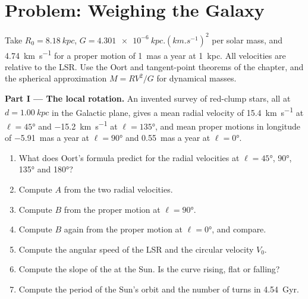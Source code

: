 \section{Problem: Weighing the Galaxy}

\begin{problem}
\label{pb:b3:milky-way-galaxies:1}
Take $R_0 = \qty{8.18}{kpc}$, $G = \qty{4.301e-6}{kpc.(km.s^{-1})^2}$ per
solar mass, and \qty{4.74}{km.s^{-1}} for a proper motion of
\qty{1}{mas} a year at \qty{1}{kpc}. All velocities are relative to the
LSR. Use the Oort and tangent-point theorems of the chapter, and the
spherical approximation $M = RV^2/G$ for dynamical masses.

\medskip\noindent\textbf{Part I --- The local rotation.} An invented
survey of red-clump stars, all at $d = \qty{1.00}{kpc}$ in the Galactic
plane, gives a mean radial velocity of \qty{+15.4}{km.s^{-1}} at
$\ell = \ang{45}$ and \qty{-15.2}{km.s^{-1}} at $\ell = \ang{135}$, and
mean proper motions in longitude of \qty{-5.91}{mas} a year at
$\ell = \ang{90}$ and \qty{+0.55}{mas} a year at $\ell = \ang{0}$.
\begin{enumerate}
\item What does Oort's formula predict for the radial velocities at
  $\ell = \ang{45}$, \ang{90}, \ang{135} and \ang{180}?
\item Compute $A$ from the two radial velocities.
\item Compute $B$ from the proper motion at $\ell = \ang{90}$.
\item Compute $B$ again from the proper motion at $\ell = \ang{0}$, and
  compare.
\item Compute the angular speed of the LSR and the circular velocity
  $V_0$.
\item Compute the slope of the  at the Sun. Is the curve
  rising, flat or falling?
\item Compute the period of the Sun's orbit and the number of turns in
  \qty{4.54}{Gyr}.
\end{enumerate}


\end{problem}
